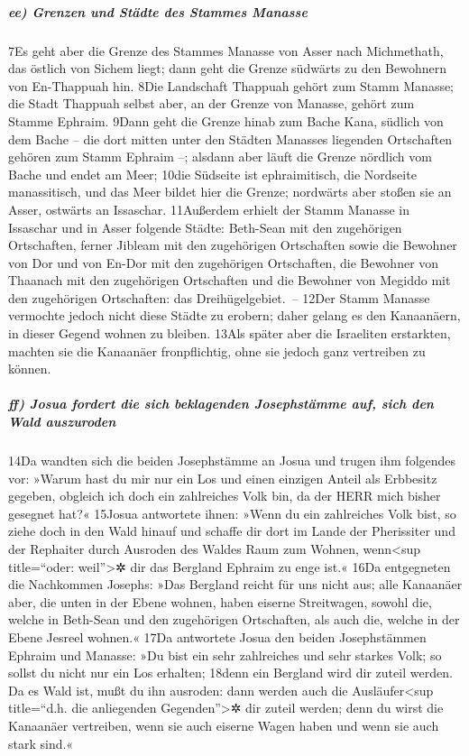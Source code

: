 \hypertarget{ee-grenzen-und-stuxe4dte-des-stammes-manasse}{%
\subparagraph{ee) Grenzen und Städte des Stammes
Manasse}\label{ee-grenzen-und-stuxe4dte-des-stammes-manasse}}

7Es geht aber die Grenze des Stammes Manasse von Asser nach Michmethath,
das östlich von Sichem liegt; dann geht die Grenze südwärts zu den
Bewohnern von En-Thappuah hin. 8Die Landschaft Thappuah gehört zum Stamm
Manasse; die Stadt Thappuah selbst aber, an der Grenze von Manasse,
gehört zum Stamme Ephraim. 9Dann geht die Grenze hinab zum Bache Kana,
südlich von dem Bache -- die dort mitten unter den Städten Manasses
liegenden Ortschaften gehören zum Stamm Ephraim --; alsdann aber läuft
die Grenze nördlich vom Bache und endet am Meer; 10die Südseite ist
ephraimitisch, die Nordseite manassitisch, und das Meer bildet hier die
Grenze; nordwärts aber stoßen sie an Asser, ostwärts an Issaschar.
11Außerdem erhielt der Stamm Manasse in Issaschar und in Asser folgende
Städte: Beth-Sean mit den zugehörigen Ortschaften, ferner Jibleam mit
den zugehörigen Ortschaften sowie die Bewohner von Dor und von En-Dor
mit den zugehörigen Ortschaften, die Bewohner von Thaanach mit den
zugehörigen Ortschaften und die Bewohner von Megiddo mit den zugehörigen
Ortschaften: das Dreihügelgebiet.~-- 12Der Stamm Manasse vermochte
jedoch nicht diese Städte zu erobern; daher gelang es den Kanaanäern, in
dieser Gegend wohnen zu bleiben. 13Als später aber die Israeliten
erstarkten, machten sie die Kanaanäer fronpflichtig, ohne sie jedoch
ganz vertreiben zu können.

\hypertarget{ff-josua-fordert-die-sich-beklagenden-josephstuxe4mme-auf-sich-den-wald-auszuroden}{%
\subparagraph{ff) Josua fordert die sich beklagenden Josephstämme auf,
sich den Wald
auszuroden}\label{ff-josua-fordert-die-sich-beklagenden-josephstuxe4mme-auf-sich-den-wald-auszuroden}}

14Da wandten sich die beiden Josephstämme an Josua und trugen ihm
folgendes vor: »Warum hast du mir nur ein Los und einen einzigen Anteil
als Erbbesitz gegeben, obgleich ich doch ein zahlreiches Volk bin, da
der HERR mich bisher gesegnet hat?« 15Josua antwortete ihnen: »Wenn du
ein zahlreiches Volk bist, so ziehe doch in den Wald hinauf und schaffe
dir dort im Lande der Pherissiter und der Rephaiter durch Ausroden des
Waldes Raum zum Wohnen, wenn\textless sup title=``oder:
weil''\textgreater✲ dir das Bergland Ephraim zu enge ist.« 16Da
entgegneten die Nachkommen Josephs: »Das Bergland reicht für uns nicht
aus; alle Kanaanäer aber, die unten in der Ebene wohnen, haben eiserne
Streitwagen, sowohl die, welche in Beth-Sean und den zugehörigen
Ortschaften, als auch die, welche in der Ebene Jesreel wohnen.« 17Da
antwortete Josua den beiden Josephstämmen Ephraim und Manasse: »Du bist
ein sehr zahlreiches und sehr starkes Volk; so sollst du nicht nur ein
Los erhalten; 18denn ein Bergland wird dir zuteil werden. Da es Wald
ist, mußt du ihn ausroden: dann werden auch die Ausläufer\textless sup
title=``d.h. die anliegenden Gegenden''\textgreater✲ dir zuteil werden;
denn du wirst die Kanaanäer vertreiben, wenn sie auch eiserne Wagen
haben und wenn sie auch stark sind.«

